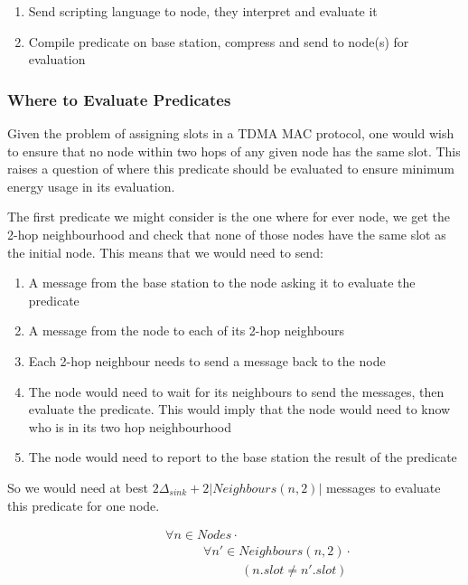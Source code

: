 \begin{enumerate}
	\item Send scripting language to node, they interpret and evaluate it
	\item Compile predicate on base station, compress and send to node(s) for evaluation
\end{enumerate}





\subsubsection{Where to Evaluate Predicates}

Given the problem of assigning slots in a TDMA MAC protocol, one would wish to ensure that no node within two hops of any given node has the same slot. This raises a question of where this predicate should be evaluated to ensure minimum energy usage in its evaluation.

The first predicate we might consider is the one where for ever node, we get the 2-hop neighbourhood and check that none of those nodes have the same slot as the initial node. This means that we would need to send:
\begin{enumerate}
	\item A message from the base station to the node asking it to evaluate the predicate
	\item A message from the node to each of its 2-hop neighbours
	\item Each 2-hop neighbour needs to send a message back to the node
	\item The node would need to wait for its neighbours to send the messages, then evaluate the predicate. This would imply that the node would need to know who is in its two hop neighbourhood
	\item The node would need to report to the base station the result of the predicate
\end{enumerate}

So we would need at best $2\Delta_{sink} + 2|Neighbours(n, 2)|$ messages to evaluate this predicate for one node.

\begin{align}
\label{eq:2-hop-slot-pred}
& \hspace{3em}	\forall n \in Nodes \cdot \\
& \hspace{6em}		\forall n' \in Neighbours(n, 2) \cdot \\
& \hspace{9em}			(n.slot \neq n'.slot)
\end{align}

